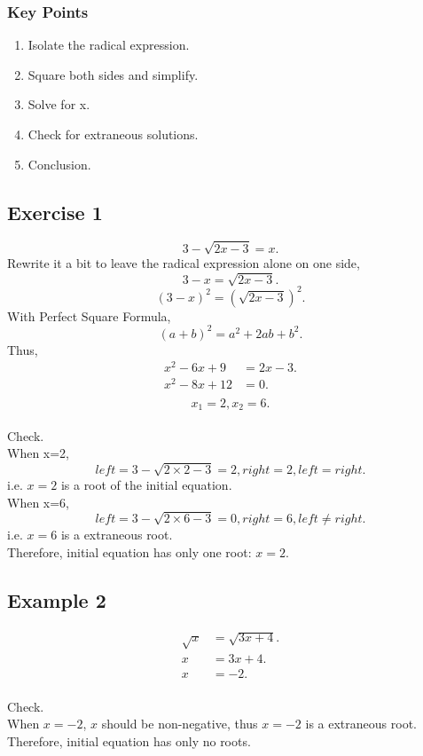 \begin{CJK}{UTF8}{gkai}
\subsubsection{Key Points}
\begin{enumerate}
\item Isolate the radical expression.
\item Square both sides and simplify.
\item Solve for x.
\item Check for extraneous solutions.
\item Conclusion.
\end{enumerate}

\subsection{Exercise 1}
$$3-\sqrt{2x-3}=x.$$
Rewrite it a bit to leave the radical expression alone on one side,
$$3-x=\sqrt{2x-3}.$$
$$(3-x)^2=(\sqrt{2x-3})^2.$$
With Perfect Square Formula,
$$(a+b)^2=a^2+2ab+b^2.$$
Thus,
\begin{align*}
x^2-6x+9&=2x-3.\\
x^2-8x+12&=0.\\
\end{align*}
$$x_1=2, x_2=6.$$
\\Check.
\\When x=2,
$$left=3-\sqrt{2\times2-3}=2,  right=2, left = right.$$
i.e. $x=2$ is a root of the initial equation.
\\When x=6,
$$left=3-\sqrt{2\times6-3}=0,  right=6, left \neq right.$$
i.e. $x=6$ is a extraneous root.
\\Therefore, initial equation has only one root: $x=2.$

\subsection{Example 2}
\begin{align*}
\sqrt{x}&=\sqrt{3x+4}.\\
x&=3x+4.\\
x&=-2.
\end{align*}
\\Check.
\\When $x=-2$,
$x$ should be non-negative, thus $x=-2$ is a extraneous root.
\\Therefore, initial equation has only no roots.


\end{CJK}
